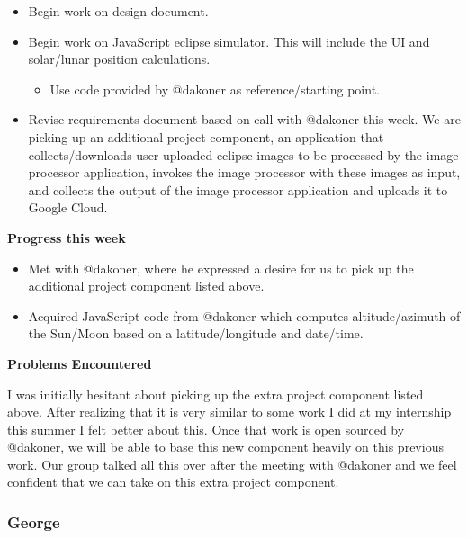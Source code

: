 \documentclass[10pt, onecolumn, draftclsnofoot, letterpaper, compsoc]{IEEEtran}
\begin{document}
    \begin{itemize}

    \item Begin work on design document.
    \item Begin work on JavaScript eclipse simulator. This will include the UI and solar/lunar position calculations.

        \begin{itemize}
            \item Use code provided by @dakoner as reference/starting point.
        \end{itemize}

    \item Revise requirements document based on call with @dakoner this week. We are picking up an additional project
      component, an application that collects/downloads user uploaded eclipse images to be processed by the image
      processor application, invokes the image processor with these images as input, and collects the output of the
      image processor application and uploads it to Google Cloud.

    \end{itemize}

    \noindent \textbf{Progress this week}

    \begin{itemize}

    \item Met with @dakoner, where he expressed a desire for us to pick up the additional project component listed above.
    \item Acquired JavaScript code from @dakoner which computes altitude/azimuth of the Sun/Moon based on a
      latitude/longitude and date/time.

    \end{itemize}

    \noindent \textbf{Problems Encountered}

    I was initially hesitant about picking up the extra project component listed above. After realizing that it
    is very similar to some work I did at my internship this summer I felt better about this. Once that work is
    open sourced by @dakoner, we will be able to base this new component heavily on this previous work. Our group
    talked all this over after the meeting with @dakoner and we feel confident that we can take on this extra
    project component.

    \subsubsection{George}
\end{document}
